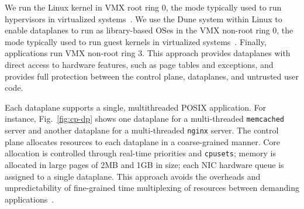 We run the Linux kernel in VMX root ring 0, the mode typically used to
run hypervisors in virtualized
systems~\cite{DBLP:journals/computer/UhligNRSMABKLS05}. We use the
Dune system within Linux to enable dataplanes to run as library-based
OSes in the VMX non-root ring 0, the mode typically used to run guest
kernels in virtualized systems~\cite{belay2012dune}. Finally, applications run
VMX non-root ring 3. This approach provides dataplanes with direct
access to hardware features, such as page tables and exceptions, and provides full
protection between the control plane, dataplanes, and untrusted user
code. %




Each \ix dataplane supports a single, multithreaded POSIX
application. For instance, Fig.~\ref{fig:cp-dp} shows one dataplane
for a multi-threaded \texttt{memcached} server and another dataplane
for a multi-threaded \texttt{nginx} server. The control plane allocates
resources to each dataplane in a coarse-grained manner. Core allocation
is controlled through real-time priorities and \texttt{cpusets};
memory is allocated in large pages of 2MB and 1GB in size; each NIC hardware queue is
assigned to a single dataplane. This approach avoids the overheads and
unpredictability of fine-grained time multiplexing of resources between
demanding applications~\cite{Leverich:RHSU:2014}.

